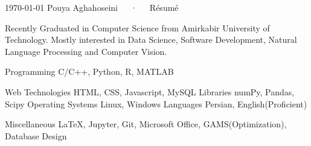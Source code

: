 \documentclass[11pt, a4paper]{awesome-cv}
\begin{document}
\makecvheader[C]

\makecvfooter
  {\today}
  {Pouya Aghahoseini~~~·~~~Résumé}
  {\thepage}


\begin{cvparagraph}
	
	Recently Graduated in Computer Science from Amirkabir University of Technology.
	Mostly interested in Data Science, Software Development, Natural Language Processing and Computer Vision.
	
\end{cvparagraph}


\begin{cvskills}
	\cvskill
	{Programming} %
	{C/C++, Python, R, MATLAB} %
	
	\cvskill
	{Web Technologies} %
	{HTML, CSS, Javascript, MySQL} %
	\cvskill
	{Libraries} %
	{numPy, Pandas, Scipy} %
	\cvskill
	{Operating Systems} %
	{Linux, Windows}
	\cvskill
	{Languages} %
	{Persian, English(Proficient)}	
	
	\cvskill
	{Miscellaneous}
	{\LaTeX, Jupyter, Git, Microsoft Office, GAMS(Optimization), Database Design}%
	
\end{cvskills}
\end{document}
